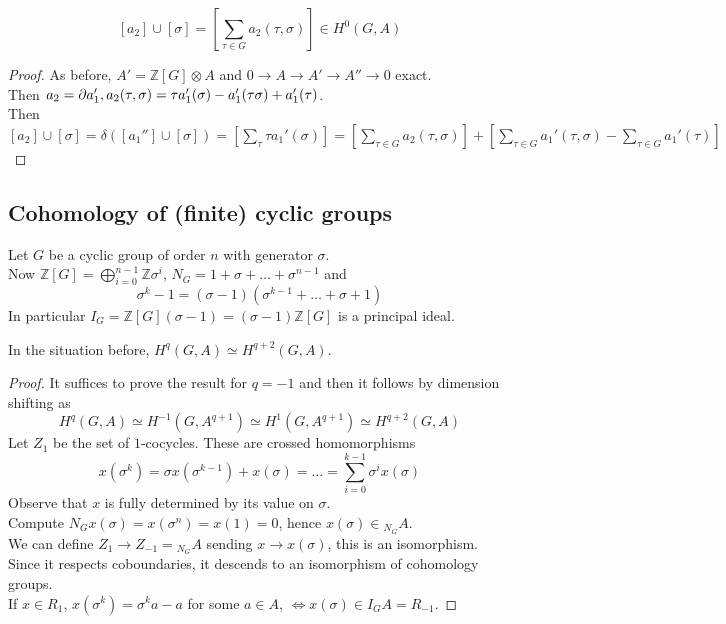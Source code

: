 \documentclass[../main.tex]{subfiles}
\begin{document}
\begin{thm}
	\[ 
	[ a_2] \cup [ \sigma] = \left[ \sum_{\tau \in G}^{ } a_2( \tau,\sigma) \right] \in H^{0}( G,A) 
	\]
\end{thm}
\begin{proof}
	As before, $A' = \mathbb{Z}[G] \otimes A$ and $0 \to A \to A'\to A'' \to 0$ exact.\\
	Then $a_2= \partial a_1', a_2( \tau,\sigma) = \tau a_1'( \sigma) - a_1'( \tau\sigma) + a_1'( \tau) $.\\
	Then $[a_2] \cup [ \sigma] = \delta( [ a_1''] \cup [ \sigma] ) = \left[ \sum_\tau \tau a_1'( \sigma)  \right] = \left[ \sum_{\tau \in G}^{ } a_2( \tau,\sigma) \right] + \left[ \sum_{\tau \in G}^{ } a_1'( \tau,\sigma) - \sum_{\tau \in G}^{ }a_1'( \tau) \right] $ 
\end{proof}
\subsection{Cohomology of (finite) cyclic groups}
Let $G$ be a cyclic group of order $n$ with generator $\sigma$.\\
Now $\mathbb{Z}[G]= \bigoplus_{i=0}^{n-1} \mathbb{Z}\sigma^{i} $, $N_G = 1 +\sigma + \ldots + \sigma^{n-1}$ and
\[ 
\sigma^{k}-1 = ( \sigma-1) ( \sigma^{k-1}+ \ldots + \sigma + 1)
\]
In particular $I_G = \mathbb{Z}[G] ( \sigma-1) = ( \sigma-1) \mathbb{Z}[G]$ is a principal ideal.
\begin{thm}
	In the situation before, $H^{q}( G,A )\simeq H^{q+2}( G,A)  $.
\end{thm}
\begin{proof}
It suffices to prove the result for $q=-1$ and then it follows by dimension shifting as
\[ 
	H^{q}( G,A) \simeq H^{-1}( G,A^{q+1}) \simeq H^{1}( G,A^{q+1}) \simeq H^{q+2} ( G,A) 
\]
Let $Z_1$ be the set of $1$-cocycles. These are crossed homomorphisms 
\[ 
x( \sigma^{k}) = \sigma x( \sigma^{k-1}) + x( \sigma) = \ldots = \sum_{i=0}^{ k-1}\sigma^{i}x( \sigma) 
\]
Observe that $x$ is fully determined by its value on $\sigma$.\\
Compute $N_G x( \sigma) = x( \sigma^{n}) = x( 1) =0$, hence $x( \sigma) \in { }_{N_G} A$.\\
We can define $Z_1\to Z_{-1} = { } _{N_G} A$ sending $x\to x( \sigma) $, this is an isomorphism.\\
Since it respects coboundaries, it descends to an isomorphism of cohomology groups.\\
If $x\in R_1$, $x( \sigma^{k}) = \sigma^{k}a-a$ for some $a\in A$, $\iff x( \sigma) \in I_G A = R_{-1} $.  
\end{proof}
\end{document}
